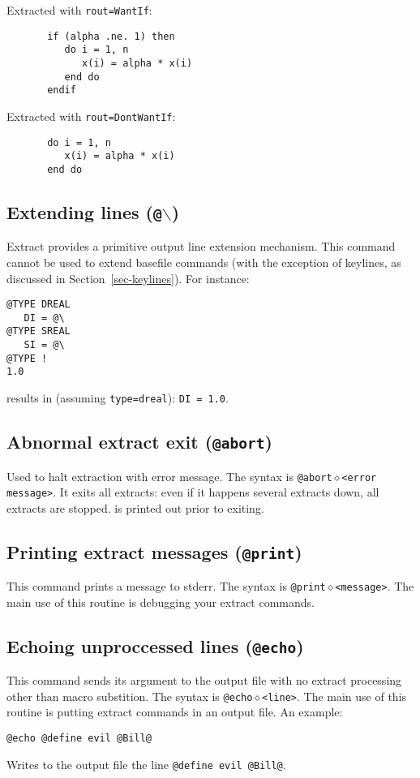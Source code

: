 \noindent
Extracted with {\tt rout=WantIf}:
\begin{verbatim}
       if (alpha .ne. 1) then
          do i = 1, n
             x(i) = alpha * x(i)
          end do
       endif
\end{verbatim}

Extracted with {\tt rout=DontWantIf}:
\begin{verbatim}
       do i = 1, n
          x(i) = alpha * x(i)
       end do
\end{verbatim}

\subsection{Extending lines ({\tt @$\backslash$})}
Extract provides a primitive output line extension mechanism.  This command
cannot be used to extend basefile commands (with the exception of keylines,
as discussed in Section~\ref{sec-keylines}).  For instance:
\begin{verbatim}
@TYPE DREAL
   DI = @\
@TYPE SREAL
   SI = @\
@TYPE !
1.0
\end{verbatim}

results in (assuming {\tt type=dreal}): {\tt DI = 1.0}.

\subsection{Abnormal extract exit ({\tt @abort})}
Used to halt extraction with error message.  The syntax is
{\tt @abort$\diamond$<error message>}.  It exits all extracts:
even if it happens several extracts down, all extracts are stopped.
{\tt <error message>} is printed out prior to exiting.

\subsection{Printing extract messages ({\tt @print})}
This command prints a message to stderr.  The syntax is
{\tt @print$\diamond$<message>}.  The main use of this routine is
debugging your extract commands.

\subsection{Echoing unproccessed lines ({\tt @echo})}
This command sends its argument to the output file with no extract
processing other than macro substition.  The syntax is
{\tt @echo$\diamond$<line>}.  The main use of this routine is
putting extract commands in an output file.  An example:
\begin{verbatim}
@echo @define evil @Bill@
\end{verbatim}
Writes to the output file the line {\tt @define evil @Bill@}.

